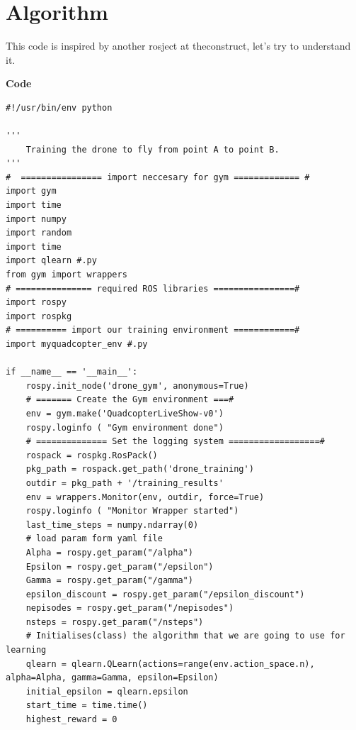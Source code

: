 \section{Algorithm}

This code is inspired by another rosject at theconstruct, let's try to understand it. 

\textbf{Code}
\begin{verbatim}
#!/usr/bin/env python

'''
    Training the drone to fly from point A to point B.
'''
#  ================ import neccesary for gym ============= #
import gym
import time
import numpy
import random
import time
import qlearn #.py
from gym import wrappers
# =============== required ROS libraries ================#
import rospy
import rospkg
# ========== import our training environment ============#
import myquadcopter_env #.py

if __name__ == '__main__':
    rospy.init_node('drone_gym', anonymous=True)
    # ======= Create the Gym environment ===#
    env = gym.make('QuadcopterLiveShow-v0')
    rospy.loginfo ( "Gym environment done")
    # ============== Set the logging system ==================#
    rospack = rospkg.RosPack()
    pkg_path = rospack.get_path('drone_training')
    outdir = pkg_path + '/training_results'
    env = wrappers.Monitor(env, outdir, force=True)
    rospy.loginfo ( "Monitor Wrapper started")
    last_time_steps = numpy.ndarray(0)
    # load param form yaml file
    Alpha = rospy.get_param("/alpha")
    Epsilon = rospy.get_param("/epsilon")
    Gamma = rospy.get_param("/gamma")
    epsilon_discount = rospy.get_param("/epsilon_discount")
    nepisodes = rospy.get_param("/nepisodes")
    nsteps = rospy.get_param("/nsteps")
    # Initialises(class) the algorithm that we are going to use for learning
    qlearn = qlearn.QLearn(actions=range(env.action_space.n), alpha=Alpha, gamma=Gamma, epsilon=Epsilon)
    initial_epsilon = qlearn.epsilon
    start_time = time.time()
    highest_reward = 0


\end{verbatim}
